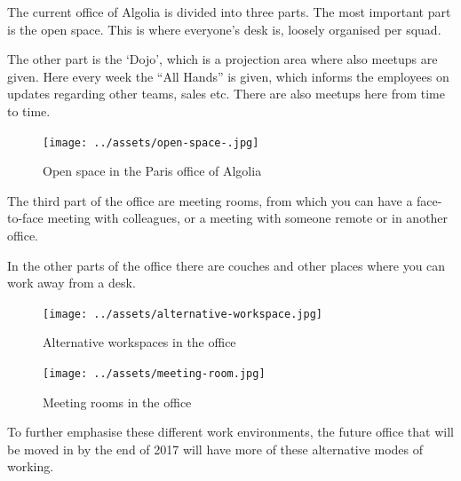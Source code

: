 The current office of Algolia is divided into three parts. The most important part is the open space. This is where everyone's desk is, loosely organised per squad.

The other part is the `Dojo', which is a projection area where also meetups are given. Here every week the ``All Hands'' is given, which informs the employees on updates regarding other teams, sales etc. There are also meetups here from time to time.


\begin{figure}[H]
  \centering
  \texttt{[image: ../assets/open-space-.jpg]}
  \caption{Open space in the Paris office of Algolia}
  \label{figure:algolia-open-space}
\end{figure}

The third part of the office are meeting rooms, from which you can have a face-to-face meeting with colleagues, or a meeting with someone remote or in another office.

In the other parts of the office there are couches and other places where you can work away from a desk.

\begin{figure}[H]
\centering
\begin{minipage}{.5\textwidth}
  \centering
  \texttt{[image: ../assets/alternative-workspace.jpg]}
  \caption{Alternative workspaces in the office}
  \label{figure:algolia-alternative-space}
\end{minipage}%
\begin{minipage}{.5\textwidth}
  \centering
  \texttt{[image: ../assets/meeting-room.jpg]}
  \caption{Meeting rooms in the office}
  \label{figure:algolia-meeting-rooms}
\end{minipage}
\end{figure}

To further emphasise these different work environments, the future office that will be moved in by the end of 2017 will have more of these alternative modes of working. %
